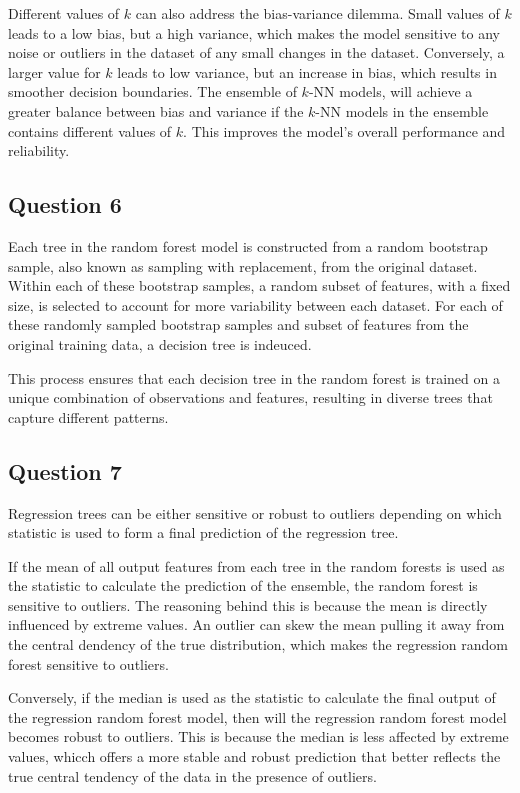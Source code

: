 \documentclass[10pt]{article}
\begin{document}
Different values of $k$ can also address the bias-variance dilemma. Small values of $k$ leads to a low bias,
but a high variance, which makes the model sensitive to any noise or outliers in the dataset of any small
changes in the dataset. Conversely, a larger value for $k$ leads to low variance, but an increase in bias,
which results in smoother decision boundaries. The ensemble of $k$-NN models, will achieve a greater balance
between bias and variance if the $k$-NN models in the ensemble contains different values of $k$. This improves the
model's overall performance and reliability.

\subsection*{Question 6}

Each tree in the random forest model is constructed from a random bootstrap sample, also known as sampling with
replacement, from the original dataset. Within each of these bootstrap samples, a random subset of features, with a
fixed size, is selected to account for more variability between each dataset. For each of these randomly sampled
bootstrap samples and subset of features from the original training data, a decision tree is indeuced.

This process ensures that each decision tree in the random forest is trained on a unique combination of
observations and features, resulting in diverse trees that capture different patterns.

\subsection*{Question 7}

Regression trees can be either sensitive or robust to outliers depending on which statistic is used to form a final
prediction of the regression tree.

If the mean of all output features from each tree in the random forests
is used as the statistic to calculate the prediction of the ensemble, the random forest is sensitive to outliers. The
reasoning behind this is because the mean is directly influenced by extreme values. An outlier can skew the mean pulling it
away from the central dendency of the true distribution, which makes the regression random forest sensitive to outliers.

Conversely, if the median is used as the statistic to calculate the final output of the regression random forest model,
then will the regression random forest model becomes robust to outliers.
This is because the median is less affected by extreme values, whicch offers a more stable and robust prediction that
better reflects the true central tendency of the data in the presence of outliers.
\end{document}
